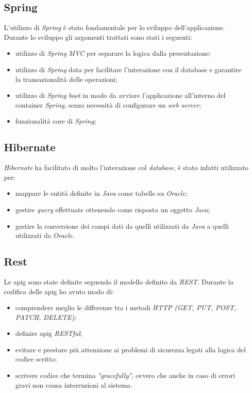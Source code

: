 \subsection{Spring}
L'utilizzo di \textit{Spring} è stato fondamentale per lo sviluppo dell'applicazione. Durante lo sviluppo gli argomenti trattati sono stati i seguenti:
\begin{itemize}
    \item utilizzo di \textit{Spring} \textit{MVC} per separare la logica dalla presentazione;
    \item utilizzo di \textit{Spring} data per facilitare l'interazione con il database e garantire la transazionalità delle operazioni;
    \item utilizzo di \textit{Spring} \textit{boot} in modo da avviare l'applicazione all'interno del container \textit{Spring}, senza necessità di configurare un \textit{web server};
    \item funzionalità core di \textit{Spring};
\end{itemize}

\subsection{Hibernate}
\textit{Hibernate} ha facilitato di molto l'interazione col \textit{database}, è stato infatti utilizzato per:
\begin{itemize}
    \item mappare le entità definite in \textit{Java} come tabelle su \textit{Oracle};
    \item gestire \textit{query} effettuate ottenendo come risposta un oggetto \textit{Java};
    \item gestire la conversione dei campi dati da quelli utilizzati da \textit{Java} a quelli utilizzati da \textit{Oracle}.
\end{itemize}

\subsection{Rest}
Le \gls{apig} sono state definite seguendo il modello definito da \textit{REST}.
Durante la codifica delle \gls{apig} ho avuto modo di:
\begin{itemize}
    \item comprendere meglio le differenze tra i metodi \textit{HTTP (GET, PUT, POST, PATCH, DELETE)};
    \item definire \gls{apig} \textit{RESTful};
    \item evitare e prestare più attenzione ai problemi di sicurezza legati alla logica del codice scritto;
    \item scrivere codice che termina \textit{"gracefully"}, ovvero che anche in caso di errori gravi non causa interruzioni al sistema.
\end{itemize}

